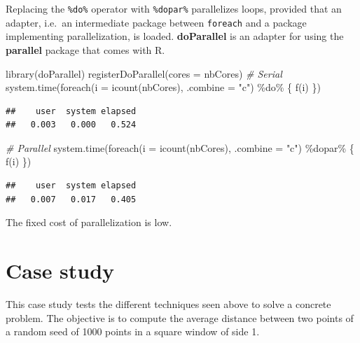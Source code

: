\documentclass[
  12pt,
  american,
  a4paper,
  extrafontsizes,onecolumn,openright
  ]{memoir}
\newenvironment{Shaded}{\begin{snugshade}}{\end{snugshade}}
\newcommand{\AttributeTok}[1]{\textcolor[rgb]{0.77,0.63,0.00}{#1}}
\newcommand{\CommentTok}[1]{\textcolor[rgb]{0.56,0.35,0.01}{\textit{#1}}}
\newcommand{\FunctionTok}[1]{\textcolor[rgb]{0.00,0.00,0.00}{#1}}
\newcommand{\NormalTok}[1]{#1}
\newcommand{\SpecialCharTok}[1]{\textcolor[rgb]{0.00,0.00,0.00}{#1}}
\newcommand{\StringTok}[1]{\textcolor[rgb]{0.31,0.60,0.02}{#1}}
\begin{document}
Replacing the \texttt{\%do\%} operator with \texttt{\%dopar\%} parallelizes loops, provided that an adapter, i.e.~an intermediate package between \texttt{foreach} and a package implementing parallelization, is loaded.
\textbf{doParallel} is an adapter for using the \textbf{parallel} package that comes with R.

\scriptsize

\begin{Shaded}
\begin{Highlighting}[]
\FunctionTok{library}\NormalTok{(doParallel)}
\FunctionTok{registerDoParallel}\NormalTok{(}\AttributeTok{cores =}\NormalTok{ nbCores)}
\CommentTok{\# Serial}
\FunctionTok{system.time}\NormalTok{(}\FunctionTok{foreach}\NormalTok{(}\AttributeTok{i =} \FunctionTok{icount}\NormalTok{(nbCores), }\AttributeTok{.combine =} \StringTok{"c"}\NormalTok{) }\SpecialCharTok{\%do\%}
\NormalTok{    \{}
        \FunctionTok{f}\NormalTok{(i)}
\NormalTok{    \})}
\end{Highlighting}
\end{Shaded}

\begin{verbatim}
##    user  system elapsed 
##   0.003   0.000   0.524
\end{verbatim}

\begin{Shaded}
\begin{Highlighting}[]
\CommentTok{\# Parallel}
\FunctionTok{system.time}\NormalTok{(}\FunctionTok{foreach}\NormalTok{(}\AttributeTok{i =} \FunctionTok{icount}\NormalTok{(nbCores), }\AttributeTok{.combine =} \StringTok{"c"}\NormalTok{) }\SpecialCharTok{\%dopar\%}
\NormalTok{    \{}
        \FunctionTok{f}\NormalTok{(i)}
\NormalTok{    \})}
\end{Highlighting}
\end{Shaded}

\begin{verbatim}
##    user  system elapsed 
##   0.007   0.017   0.405
\end{verbatim}

\normalsize

The fixed cost of parallelization is low.

\hypertarget{sec:cas}{%
\section{Case study}\label{sec:cas}}

This case study tests the different techniques seen above to solve a concrete problem.
The objective is to compute the average distance between two points of a random seed of 1000 points in a square window of side 1.
\end{document}
